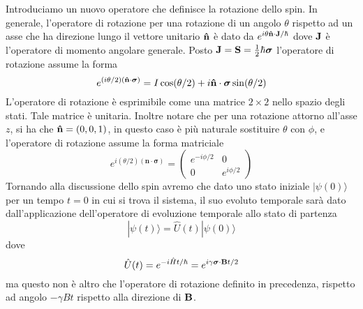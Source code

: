 Introduciamo un nuovo operatore che definisce la rotazione dello spin. In generale, l'operatore di rotazione per una rotazione di un angolo $\theta$ rispetto ad un asse che ha direzione lungo il vettore unitario $\bold{\hat{n}}$ \`e dato da $e^{i \theta \bold{\hat{n}} \cdot \bold{J}/ \hbar}$ dove $\bold{J}$ \`e l'operatore di momento angolare generale. Posto $\bold{J} = \bold{S} = \frac{1}{2}\hbar \boldsymbol{\sigma}$ l'operatore di rotazione assume la forma 
\begin{equation*}
	e^{(i \theta /2)(\bold{\hat{n}} \cdot \boldsymbol{\sigma})} = I \cos(\theta/2) + i \bold{\hat{n}} \cdot \boldsymbol{\sigma} \sin(\theta/2) 
\end{equation*}  
L'operatore di rotazione \`e esprimibile come una matrice $2 \times 2$ nello spazio degli stati. Tale matrice \`e unitaria. Inoltre notare che per una rotazione attorno all'asse $z$, si ha che $\bold{\hat{n}} = (0,0,1)$, in questo caso \`e pi\`u naturale sostituire $\theta$ con $\phi$, e l'operatore di rotazione assume la forma matriciale
\begin{equation*}
	e^{i(\theta / 2)(\mathbf{n} \cdot \boldsymbol{\sigma})}=\left(\begin{array}{cc}
e^{-i \phi / 2} & 0 \\
0 & e^{i \phi / 2}
\end{array}\right)
\end{equation*}
Tornando alla discussione dello spin avremo che dato uno stato iniziale $| \psi (0) \rangle $ per un tempo $t = 0$ in cui si trova il sistema, il suo evoluto temporale sar\`a dato dall'applicazione dell'operatore di evoluzione temporale allo stato di partenza
\begin{equation*}
	|\psi(t) \rangle = \hat{U}(t)|\psi(0) \rangle 
\end{equation*}
dove 
\begin{equation*}
	\hat{U}(t) = e^{-i\hat{H}t/\hbar} = e^{i \gamma \boldsymbol{\sigma} \cdot \bold{B}t/2}
\end{equation*}
ma questo non \`e altro che l'operatore di rotazione definito in precedenza, rispetto ad angolo $- \gamma Bt$ rispetto alla direzione di $\bold{B}$. 

